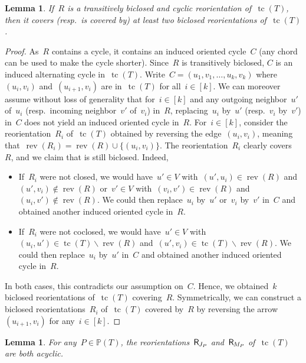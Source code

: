 \documentclass{amsart}
\newtheorem{lemma}[theorem]{Lemma}
\theoremstyle{definition}
\newcommand{\ssm}{\smallsetminus} %
\DeclareMathOperator{\tc}{tc} %
\newcommand{\mymap}[2]{\mathsf{#1}_{\hspace{-.7pt}#2}}
\newcommand{\reori}[1]{\mymap{R}{#1}}  %
\DeclareMathOperator{\rev}{rev} %
\newcommand{\PP}{\mathbb P} %
\begin{document}
\begin{lemma}
\label{lem:irreduciblesReorientationsAcyclicT}
If~$R$ is a transitively biclosed and cyclic reorientation of~$\tc(T)$, then it covers (resp.~is covered by) at least two biclosed reorientations of~$\tc(T)$.
\end{lemma}

\begin{proof}
As~$R$ contains a cycle, it contains an induced oriented cycle~$C$ (any chord can be used to make the cycle shorter).
Since~$R$ is transitively biclosed, $C$ is an induced alternating cycle in~$\tc(T)$.
Write~$C = (u_1, v_1, \dots, u_k, v_k)$ where~$(u_i, v_i)$ and~$(u_{i+1},v_i)$ are in~$\tc(T)$ for all~$i \in [k]$.
We can moreover assume without loss of generality that for~$i \in [k]$ and any outgoing neighbor~$u'$ of~$u_i$ (resp.~incoming neighbor~$v'$ of~$v_i$) in~$R$, replacing~$u_i$ by~$u'$ (resp.~$v_i$ by~$v'$) in~$C$ does not yield an induced oriented cycle in~$R$.
For~$i \in [k]$, consider the reorientation~$R_i$ of~$\tc(T)$ obtained by reversing the edge~$(u_i,v_i)$, meaning that~$\rev(R_i) = \rev(R) \cup \{(u_i,v_i)\}$.
The reorientation~$R_i$ clearly covers~$R$, and we claim that is still biclosed.
Indeed,
\begin{itemize}
\item If~$R_i$ were not closed, we would have~$u' \in V$ with~$(u',u_i) \in \rev(R)$ and~$(u',v_i) \notin \rev(R)$ or~$v' \in V$ with~$(v_i, v') \in \rev(R)$ and~$(u_i,v') \notin \rev(R)$. We could then replace~$u_i$ by~$u'$ or~$v_i$ by~$v'$ in~$C$ and obtained another induced oriented cycle in~$R$.
\item If~$R_i$ were not coclosed, we would have~$u' \in V$ with~$(u_i,u') \in \tc(T) \ssm \rev(R)$ and~$(u',v_i) \in \tc(T) \ssm \rev(R)$. We could then replace~$u_i$ by~$u'$ in~$C$ and obtained another induced oriented cycle in~$R$.
\end{itemize}
In both cases, this contradicts our assumption on~$C$.
Hence, we obtained~$k$ biclosed reorientations of~$\tc(T)$ covering~$R$.
Symmetrically, we can construct a biclosed reorientations~$R_i$ of~$\tc(T)$ covered by~$R$ by reversing the arrow~$(u_{i+1}, v_i)$ for any~$i \in [k]$.
\end{proof}

\begin{lemma}
\label{lem:irreduciblesOrnamentationsAcyclicT}
For any~$P \in \PP(T)$, the reorientations~$\reori{J_P}$ and~$\reori{M_P}$ of~$\tc(T)$ are both acyclic.
\end{lemma}
\end{document}
